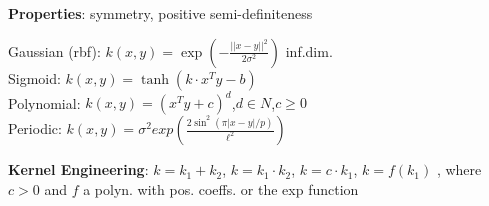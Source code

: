 \textbf{Properties}: symmetry, positive semi-definiteness

Gaussian (rbf): $k(x,y) = \exp( -\tfrac{||x-y||^2}{2\sigma^2})$ {\tiny inf.dim.}\\
Sigmoid: $k(x,y) = \tanh(k\cdot x^Ty - b)$ {\tiny{}} \\
Polynomial: $k(x,y) = (x^Ty {+} c)^d$,$d\in N$,$c\geq0$ \\
Periodic: $k(x,y) = \sigma ^2 exp(\frac{2\sin ^2 (\pi |x-y|/p)}{\ell ^2})$

\textbf{Kernel Engineering}:
$k = k_1 + k_2$, $k = k_1 \cdot k_2$, $k = c \cdot k_1$, $k = f(k_1)$
, where $c > 0$ and $f$ a polyn. with pos. coeffs. or the exp function





